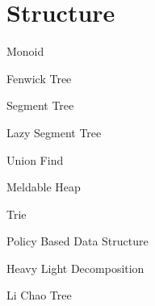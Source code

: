 \section{Structure}

Monoid


Fenwick Tree


Segment Tree


Lazy Segment Tree





Union Find


Meldable Heap


Trie


Policy Based Data Structure


Heavy Light Decomposition


Li Chao Tree

